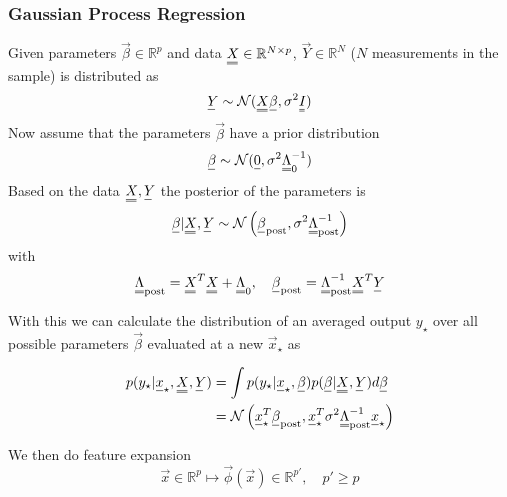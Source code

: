 \subsubsection{Gaussian Process Regression\skipthis}
Given parameters $\vec{\beta} \in \mathbb{R}^p$ and data $\mat{X} \in \mathbb{R}^{N \times p}$, 
$\vec{Y} \in \mathbb{R}^N$ ($N$ measurements in the sample) is distributed as
\begin{equation}
    \vec{Y} \sim \mathcal{N}(\mat{X} \vec{\beta}, \sigma^2 \mat{I})
\end{equation}
Now assume that the parameters $\vec{\beta}$ have a prior distribution
\begin{equation}
    \vec{\beta} \sim \mathcal{N}(\vec{0}, \sigma^2 \mat{\Lambda}_0^{-1})
\end{equation}
Based on the data $\mat{X}, \vec{Y}$ the posterior of the parameters is
\begin{equation}
    \vec{\beta} | \mat{X}, \vec{Y} \sim \mathcal{N}\left( \vec{\beta}_{\text{post}}, \sigma^2 \mat{\Lambda}_{\text{post}}^{-1} \right)
\end{equation}
with
\begin{equation}
    \mat{\Lambda}_{\text{post}} = \mat{X}^T \mat{X} + \mat{\Lambda}_0, \quad \vec{\beta}_{\text{post}} = \mat{\Lambda}_{\text{post}}^{-1} \mat{X}^T \vec{Y}
\end{equation}

With this we can calculate the distribution of an averaged output $y_\star$ over all possible parameters $\vec{\beta}$ evaluated
at a new $\vec{x}_\star$ as

\begin{equation}
    \begin{aligned}
        p(y_\star | \vec{x}_\star, \mat{X}, \vec{Y}) &= \int p(y_\star | \vec{x}_\star, \vec{\beta}) p(\vec{\beta} | \mat{X}, \vec{Y}) d\vec{\beta} \\
        &= \mathcal{N}\left( \vec{x}_\star^T \vec{\beta}_{\text{post}}, \vec{x}_\star^T \sigma^2 \mat{\Lambda}_{\text{post}}^{-1} \vec{x}_\star\right)
    \end{aligned}
\end{equation}

We then do feature expansion
\begin{equation}
    \vec{x} \in \mathbb{R}^p \mapsto \vec{\phi}(\vec{x}) \in \mathbb{R}^{p'}, \quad p' \geq p
\end{equation}

